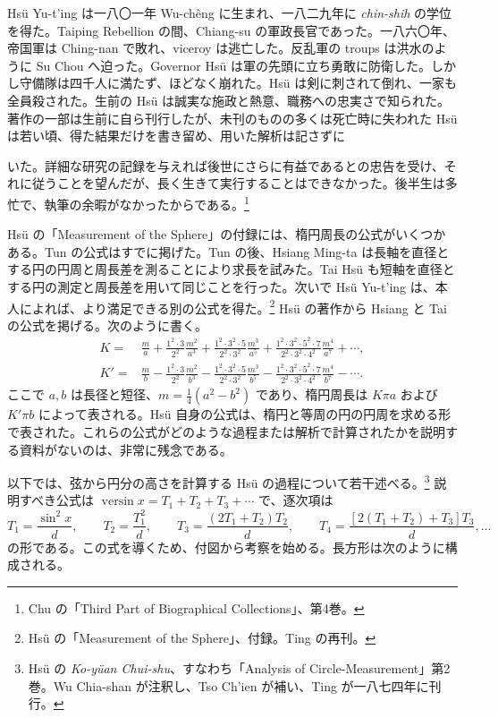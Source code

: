 \documentclass[11pt]{article}
\newcommand{\scanpage}[2]{\clearpage\setcounter{footnote}{0}\noindent{\footnotesize\color{gray}PDF #1 頁 · #2}\par\medskip}
\newcommand{\scanfooter}{}
\newcommand{\versin}{\mathop{\mathrm{versin}}}
\begin{document}
Hsü Yu-t'ing は一八〇一年 Wu-chêng に生まれ、一八二九年に \emph{chin-shih} の学位を得た。Taiping Rebellion の間、Chiang-su の軍政長官であった。一八六〇年、帝国軍は Ching-nan で敗れ、viceroy は逃亡した。反乱軍の troups は洪水のように Su Chou へ迫った。Governor Hsü は軍の先頭に立ち勇敢に防衛した。しかし守備隊は四千人に満たず、ほどなく崩れた。Hsü は剣に刺されて倒れ、一家も全員殺された。生前の Hsü は誠実な施政と熱意、職務への忠実さで知られた。著作の一部は生前に自ら刊行したが、未刊のものの多くは死亡時に失われた Hsü は若い頃、得た結果だけを書き留め、用いた解析は記さずに
\scanfooter

\scanpage{0167}{第21章、印刷頁153}
いた。詳細な研究の記録を与えれば後世にさらに有益であるとの忠告を受け、それに従うことを望んだが、長く生きて実行することはできなかった。後半生は多忙で、執筆の余暇がなかったからである。\footnote{Chu の「Third Part of Biographical Collections」、第4巻。}

Hsü の「Measurement of the Sphere」の付録には、楕円周長の公式がいくつかある。Tun の公式はすでに掲げた。Tun の後、Hsiang Ming-ta は長軸を直径とする円の円周と周長差を測ることにより求長を試みた。Tai Hsü も短軸を直径とする円の測定と周長差を用いて同じことを行った。次いで Hsü Yu-t'ing は、本人によれば、より満足できる別の公式を得た。\footnote{Hsü の「Measurement of the Sphere」、付録。Ting の再刊。} Hsü の著作から Hsiang と Tai の公式を掲げる。次のように書く。
\[
\begin{aligned}
K={}&\frac{m}{a}+\frac{1^2\cdot3}{2^2}\frac{m^2}{a^3}
+\frac{1^2\cdot3^2\cdot5}{2^2\cdot3^2}\frac{m^3}{a^5}
+\frac{1^2\cdot3^2\cdot5^2\cdot7}{2^2\cdot3^2\cdot4^2}\frac{m^4}{a^7}+\cdots,\\
K'={}&\frac{m}{b}-\frac{1^2\cdot3}{2^2}\frac{m^2}{b^3}
-\frac{1^2\cdot3^2\cdot5}{2^2\cdot3^2}\frac{m^3}{b^5}
-\frac{1^2\cdot3^2\cdot5^2\cdot7}{2^2\cdot3^2\cdot4^2}\frac{m^4}{b^7}-\cdots.
\end{aligned}
\]
ここで $a,b$ は長径と短径、$m=\frac14(a^2-b^2)$ であり、楕円周長は $K\pi a$ および $K'\pi b$ によって表される。Hsü 自身の公式は、楕円と等周の円の円周を求める形で表された。これらの公式がどのような過程または解析で計算されたかを説明する資料がないのは、非常に残念である。

以下では、弦から円分の高さを計算する Hsü の過程について若干述べる。\footnote{Hsü の \emph{Ko-yüan Chui-shu}、すなわち「Analysis of Circle-Measurement」第2巻。Wu Chia-shan が注釈し、Tso Ch'ien が補い、Ting が一八七四年に刊行。} 説明すべき公式は $\versin x=T_1+T_2+T_3+\cdots$ で、逐次項は
\[
T_1=\frac{\sin^2x}{d},\qquad
T_2=\frac{T_1^2}{d},\qquad
T_3=\frac{(2T_1+T_2)T_2}{d},\qquad
T_4=\frac{[2(T_1+T_2)+T_3]T_3}{d},\ldots
\]
の形である。この式を導くため、付図から考察を始める。長方形は次のように構成される。
\scanfooter
\end{document}
